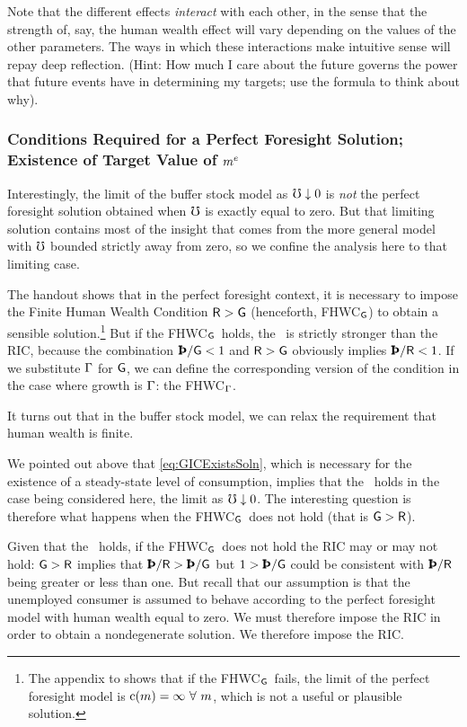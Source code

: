\documentclass{handout}
\begin{document}
Note that the different effects {\it interact} with each other, in the
sense that the strength of, say, the human wealth effect will vary
depending on the values of the other parameters.  The ways in which
these interactions make intuitive sense will repay deep reflection.
(Hint: How much I care about the future governs the power that future
events have in determining my targets; use the formula to think about why).

\subsubsection{Conditions Required for a Perfect Foresight Solution; Existence of Target Value of $m^{e}$}

Interestingly, the limit of the buffer stock model as $\mho \downarrow 0$ is {\it not} the perfect foresight solution obtained when $\mho$ is exactly equal to zero.  But that limiting solution contains most of the insight that comes from the more general model with $\mho$ bounded strictly away from zero, so we confine the analysis here to that limiting case. 

\providecommand{\FHWCPGro}{FHWC$_{\PGro}$}
\providecommand{\FHWCWGro}{FHWC$_{\WGro}$}
The handout  shows that in the perfect foresight context, it is necessary to impose the Finite Human Wealth Condition $\mathsf{R} > \mathsf{G}$ (henceforth, \FHWCWGro) to obtain a sensible solution.\footnote{The appendix to  shows that if the \FHWCWGro~fails, the limit of the perfect foresight model is $\mathrm{c}(m)=\infty~\forall~m$, which is not a useful or plausible solution.}  But if the \FHWCWGro~holds, the \GICWGro~is strictly stronger than the RIC, because the combination $\Pat/\WGro < 1$ and $\mathsf{R} > \mathsf{G}$ obviously implies $\Pat/\Rfree < 1$.  If we substitute $\Gamma$ for $\mathsf{G}$, we can define the corresponding version of the condition in the case where growth is $\Gamma$: the \FHWCPGro.

It turns out that in the buffer stock model, we can relax the requirement that human wealth is finite.  

We pointed out above that \eqref{eq:GICExistsSoln}, which is necessary for the existence of a steady-state level of consumption, implies that the \GICPGro~holds in the case being considered here, the limit as $\mho \downarrow 0$.  The interesting question is therefore what happens when the \FHWCWGro~does not hold (that is $\mathsf{G} > \mathsf{R}$).  

Given that the \GICWGro~holds, if the \FHWCWGro~does not hold the RIC may or may not hold:  $\mathsf{G} > \mathsf{R}$ implies that $\Pat/\Rfree > \Pat/\WGro$ but $1 > \Pat/\WGro$ could be consistent with $\Pat/\Rfree$ being greater or less than one.  But recall that our assumption is that the unemployed consumer is assumed to behave according to the perfect foresight model with human wealth equal to zero.  We must therefore impose the RIC in order to obtain a nondegenerate solution.  We therefore impose the RIC.
\end{document}
